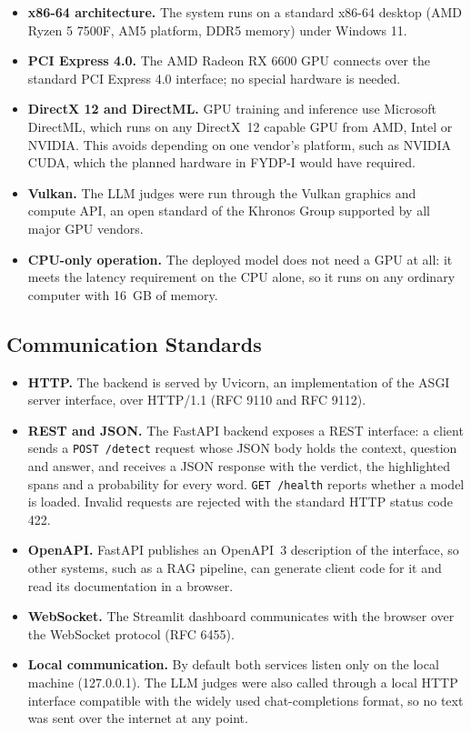 \begin{itemize}
  \item \textbf{x86-64 architecture.} The system runs on a standard x86-64
  desktop (AMD Ryzen 5 7500F, AM5 platform, DDR5 memory) under Windows 11.
  \item \textbf{PCI Express 4.0.} The AMD Radeon RX 6600 GPU connects over the
  standard PCI Express 4.0 interface; no special hardware is needed.
  \item \textbf{DirectX 12 and DirectML.} GPU training and inference use
  Microsoft DirectML, which runs on any DirectX~12 capable GPU from AMD, Intel
  or NVIDIA. This avoids depending on one vendor's platform, such as NVIDIA
  CUDA, which the planned hardware in FYDP-I would have required.
  \item \textbf{Vulkan.} The LLM judges were run through the Vulkan graphics and
  compute API, an open standard of the Khronos Group supported by all major GPU
  vendors.
  \item \textbf{CPU-only operation.} The deployed model does not need a GPU at
  all: it meets the latency requirement on the CPU alone, so it runs on any
  ordinary computer with 16~GB of memory.
\end{itemize}

\subsection{Communication Standards}

\begin{itemize}
  \item \textbf{HTTP.} The backend is served by Uvicorn, an implementation of
  the ASGI server interface, over HTTP/1.1 (RFC 9110 and RFC 9112).
  \item \textbf{REST and JSON.} The FastAPI backend exposes a REST interface: a
  client sends a \texttt{POST /detect} request whose JSON body holds the
  context, question and answer, and receives a JSON response with the verdict,
  the highlighted spans and a probability for every word. \texttt{GET /health}
  reports whether a model is loaded. Invalid requests are rejected with the
  standard HTTP status code 422.
  \item \textbf{OpenAPI.} FastAPI publishes an OpenAPI~3 description of the
  interface, so other systems, such as a RAG pipeline, can generate client
  code for it and read its documentation in a browser.
  \item \textbf{WebSocket.} The Streamlit dashboard communicates with the
  browser over the WebSocket protocol (RFC 6455).
  \item \textbf{Local communication.} By default both services listen only on
  the local machine (127.0.0.1). The LLM judges were also called through a
  local HTTP interface compatible with the widely used chat-completions
  format, so no text was sent over the internet at any point.
\end{itemize}

